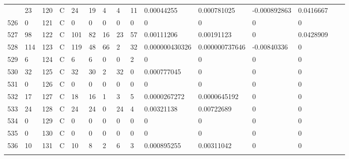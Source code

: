 \begin{longtable}{lllllllllllllll}
\begin{comment}
	525 & 23                & 120 & C   & 24                & 19                & 4                 & 4    & 11         & 0.00044255     & 0.000781025    & -0.000892863  & 0.0416667    \\
	526 & 0                 & 121 & C   & 0                 & 0                 & 0                 & 0    & 0          & 0              & 0              & 0             & 0            \\
	527 & 98                & 122 & C   & 101               & 82                & 16                & 23   & 57         & 0.00111206     & 0.00191123     & 0             & 0.0428909    \\
	528 & 114               & 123 & C   & 119               & 48                & 66                & 2    & 32         & 0.000000430326 & 0.000000737646 & -0.00840336   & 0            \\
	529 & 6                 & 124 & C   & 6                 & 6                 & 0                 & 0    & 2          & 0              & 0              & 0             & 0            \\
	530 & 32                & 125 & C   & 32                & 30                & 2                 & 32   & 0          & 0.000777045    & 0              & 0             & 0            \\
	531 & 0                 & 126 & C   & 0                 & 0                 & 0                 & 0    & 0          & 0              & 0              & 0             & 0            \\
	532 & 17                & 127 & C   & 18                & 16                & 1                 & 3    & 5          & 0.0000267272   & 0.0000645192   & 0             & 0            \\
	533 & 24                & 128 & C   & 24                & 24                & 0                 & 24   & 4          & 0.00321138     & 0.00722689     & 0             & 0            \\
	534 & 0                 & 129 & C   & 0                 & 0                 & 0                 & 0    & 0          & 0              & 0              & 0             & 0            \\
	535 & 0                 & 130 & C   & 0                 & 0                 & 0                 & 0    & 0          & 0              & 0              & 0             & 0            \\
	536 & 10                & 131 & C   & 10                & 8                 & 2                 & 6    & 3          & 0.000895255    & 0.00311042     & 0             & 0            \\

\end{comment}
\end{longtable}
